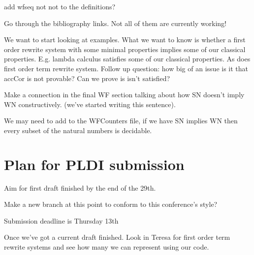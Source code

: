 \documentclass{article}
\newcommand{\cmark}{\ding{51}}%
\newcommand{\done}{\rlap{$\square$}{\raisebox{2pt}{\large\hspace{1pt}\cmark}}%
\hspace{-2.5pt}}
\begin{document}
\begin{todolist}
\item add wfseq not not to the definitions?
\item [\done] Go through the bibliography links. Not all of them are currently working!
\item We want to start looking at examples. What we want to know is whether a first order rewrite system with some minimal properties implies some of our classical properties. E.g. lambda calculus satisfies some of our classical properties. As does first order term rewrite system. Follow up question: how big of an issue is it that accCor is not provable? Can we prove is isn't satisfied? 
\item Make a connection in the final WF section talking about how SN doesn't imply WN constructively. (we've started writing this sentence). 
\item We may need to add to the WFCounters file, if we have SN implies WN then every subset of the natural numbers is decidable.  
\end{todolist}


\section*{Plan for PLDI submission}
\begin{todolist}
  \item Aim for first draft finished by the end of the 29th.
  \item Make a new branch at this point to conform to this conference's style?
  \item Submission deadline is Thursday 13th 
  \item Once we've got a current draft finished. Look in Teresa for first order term rewrite systems and see how many we can represent using our code.
\end{todolist}
\end{document}
